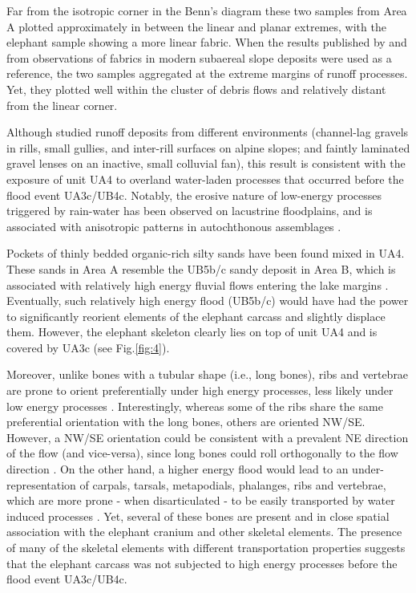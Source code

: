 \documentclass[preprint,authoryear,times]{elsarticle} %
\begin{document}
Far from the isotropic corner in the Benn's diagram these two samples from Area A plotted approximately in between the linear and planar extremes, with the elephant sample showing a more linear fabric. When the results published by \cite{Bertran1997} and \cite{Lenoble2004} from observations of fabrics in modern subaereal slope deposits were used as a reference, the two samples aggregated at the extreme margins of runoff processes. Yet, they plotted well within the cluster of debris flows and relatively distant from the linear corner.

Although \cite{Bertran1997} studied runoff deposits from different environments (channel-lag gravels in rills, small gullies, and inter-rill surfaces on alpine slopes; and faintly laminated gravel lenses on an inactive, small colluvial fan), this result is consistent with the exposure of unit UA4 to overland water-laden processes that occurred before the flood event UA3c/UB4c. Notably, the erosive nature of low-energy processes triggered by rain-water has been observed on lacustrine floodplains, and is associated with anisotropic patterns in autochthonous assemblages \citep{Cobo-Sanchez2014,Dominguez-Rodrigo2014,Garcia-Moreno2016}.

Pockets of thinly bedded organic-rich silty sands have been found mixed in UA4. These sands in Area A resemble the UB5b/c sandy deposit in Area B, which is associated with relatively high energy fluvial flows entering the lake margins \citep{Karkanas}. Eventually, such relatively high energy flood (UB5b/c) would have had the power to significantly reorient elements of the elephant carcass and slightly displace them. However, the elephant skeleton clearly lies on top of unit UA4 and is covered by UA3c (see Fig.\ref{fig:4}).

Moreover, unlike bones with a tubular shape (i.e., long bones), ribs and vertebrae are prone to orient preferentially under high energy processes, less likely under low energy processes \citep{Dominguez-Rodrigo2013,Dominguez-Rodrigo2014}. Interestingly, whereas some of the ribs share the same preferential orientation with the long bones, others are oriented NW/SE. However, a NW/SE orientation could be consistent with a prevalent NE direction of the flow (and vice-versa), since long bones could roll orthogonally to the flow direction \citep{Voorhies1969}. On the other hand, a higher energy flood would lead to an under-representation of carpals, tarsals, metapodials, phalanges, ribs and vertebrae, which are more prone - when disarticulated - to be easily transported by water induced processes \citep{Voorhies1969}. Yet, several of these bones are present and in close spatial association with the elephant cranium and other skeletal elements. The presence of many of the skeletal elements with different transportation properties suggests that the elephant carcass was not subjected to high energy processes before the flood event UA3c/UB4c. %
\end{document}
